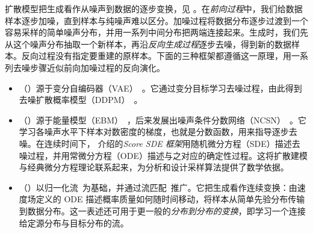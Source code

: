 扩散模型把生成看作从噪声到数据的逐步变换，见 。在\emph{前向过程}中，我们给数据样本逐步加噪，直到样本与纯噪声难以区分。加噪过程将数据分布逐步过渡到一个容易采样的简单噪声分布，并用一系列中间分布把两端连接起来。生成时，我们先从这个噪声分布抽取一个新样本，再沿\emph{反向生成过程}逐步去噪，得到新的数据样本。反向过程没有指定要重建的原样本。下面的三种框架都遵循这一原理，用一系列去噪步骤近似前向加噪过程的反向演化。
\begin{itemize}
    \item {}（）源于变分自编码器（VAE）~\citep{kingma2013auto}。它通过变分目标学习去噪过程，由此得到去噪扩散概率模型（DDPM）~\citep{sohl2015deep,ho2020denoising}。
    \item {}（）源于能量模型（EBM）~\citep{ackley1985learning}，后来发展出噪声条件分数网络（NCSN）~\citep{song2019generative}。它学习各噪声水平下样本对数密度的梯度，也就是分数函数，用来指导逐步去噪。在连续时间下， 介绍的\emph{Score SDE 框架}用随机微分方程（SDE）描述去噪过程，并用常微分方程（ODE）描述与之对应的确定性过程。这将扩散建模与经典微分方程理论联系起来，为分析和设计采样算法提供了数学依据。
    \item {}（）以归一化流~\citep{rezende2015variational}为基础，并通过流匹配~\citep{lipman2022flow}推广。它把生成看作连续变换：由速度场定义的 ODE 描述概率质量如何随时间移动，将样本从简单先验分布传输到数据分布。这一表述还可用于更一般的\emph{分布到分布的变换}，即学习一个连接给定源分布与目标分布的流。
\end{itemize}


